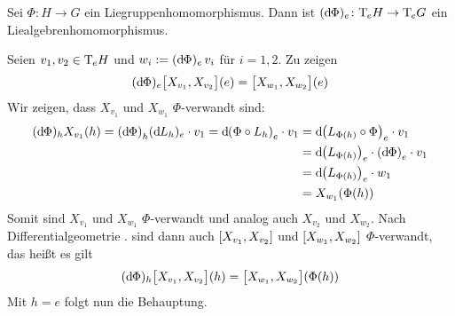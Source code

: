 \begin{lemma}[label=lem:122,{name=[{Differntial von Liegruppenhom. ist Liealgebrenhom.}]}]
	Sei $\Phi \colon H \to G$ ein Liegruppenhomomorphismus.
	Dann ist $(\mathd\Phi)_e \colon \Tmap_e H \to \Tmap_e G$ ein Liealgebrenhomomorphismus.
\end{lemma}
\begin{beweis}
	Seien $v_1,v_2 \in \Tmap_e H$ und $w_i := (\mathd \Phi)_e \, v_i$ für $i=1,2$.
	Zu zeigen
	\[
		(\mathd \Phi)_e \benbrace[\big]{X_{v_1}, X_{v_2}} (e) = \benbrace[\big]{X_{w_1},X_{w_2}}(e)
	\]
	Wir zeigen, dass $X_{v_1}$ und $X_{w_1}$ $\Phi$-verwandt sind:
	\begin{align}
		(\mathd \Phi)_h X_{v_1}(h) = \enbrace*{\mathd \Phi}_h (\mathd L_h)_e \cdot v_1 = \mathd \enbrace*{\Phi \circ L_h}_e \cdot v_1 
		&= \mathd \enbrace*{L_{\Phi(h)} \circ \Phi}_e \cdot v_1 \\
		&= \mathd \enbrace*{L_{\Phi(h)}}_e \cdot \enbrace*{\mathd \Phi}_e \cdot v_1 \\
		&= \mathd \enbrace*{L_{\Phi(h)}}_e \cdot w_1 \\
		&= X_{w_1}(\Phi(h))
	\end{align}
	Somit sind $X_{v_1}$ und $X_{w_1}$ $\Phi$-verwandt und analog auch $X_{v_2}$ und $X_{w_2}$.
	Nach Differentialgeometrie . sind dann auch $\benbrace*{X_{v_1}, X_{v_2}}$ und $\benbrace*{X_{w_1},X_{w_2}}$ $\Phi$-verwandt, das heißt es gilt
	\[
		(\mathd \Phi)_h \benbrace[\big]{X_{v_1},X_{v_2}}(h) = \benbrace[\big]{X_{w_1}, X_{w_2}} \enbrace*{\Phi(h)}
	\]
	Mit $h=e$ folgt nun die Behauptung.
\end{beweis}

